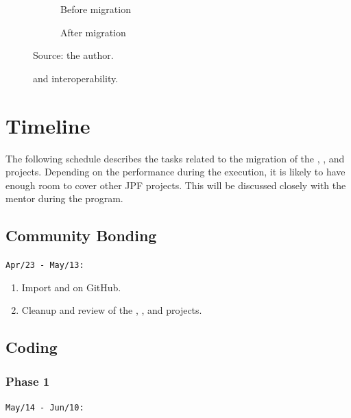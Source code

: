 \documentclass{article}
\begin{document}
\clearpage

\begin{figure}[t!]
    \centering
    \begin{subfigure}[b]{0.45\textwidth}
        
        \caption{Before migration}
    \end{subfigure}
    \hfill
    \begin{subfigure}[b]{0.45\textwidth}
        
        \caption{After migration}
    \end{subfigure}
    \caption{\ant{} and \gradle{} interoperability.\label{fig:gradle-ant-dep}}
    {\scriptsize Source: the author.}
\end{figure}

\section{Timeline}
\label{sec:time}

The following schedule describes the tasks related to the migration of the
\jpfcore{}, \jpfsymbc{}, and \jpftemplate{} projects.
Depending on the performance during the execution, it is likely to have enough
room to cover other JPF projects.
This will be discussed closely with the mentor during the program.

\subsection*{Community Bonding}

\noindent\texttt{Apr/23 - May/13:}

\begin{enumerate}
\item Import \jpfsymbc{} and \jpftemplate{} on GitHub.
\item Cleanup and review of the \jpfcore, \jpfsymbc, and \jpftemplate{}
      projects.
\end{enumerate}

\subsection*{Coding}
\subsubsection*{Phase 1}
\noindent\texttt{May/14 - Jun/10:}
\end{document}

